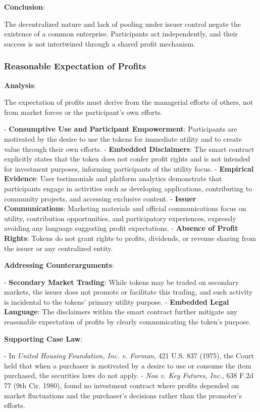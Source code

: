 \documentclass[a4paper,12pt]{article}
\begin{document}
\textbf{Conclusion}:

The decentralized nature and lack of pooling under issuer control negate the existence of a common enterprise. Participants act independently, and their success is not intertwined through a shared profit mechanism.

\subsubsection{Reasonable Expectation of Profits}
\textbf{Analysis}: 

The expectation of profits must derive from the managerial efforts of others, not from market forces or the participant's own efforts.

- \textbf{Consumptive Use and Participant Empowerment}: Participants are motivated by the desire to use the tokens for immediate utility and to create value through their own efforts.
- \textbf{Embedded Disclaimers}: The smart contract explicitly states that the token does not confer profit rights and is not intended for investment purposes, informing participants of the utility focus.
- \textbf{Empirical Evidence}: User testimonials and platform analytics demonstrate that participants engage in activities such as developing applications, contributing to community projects, and accessing exclusive content.
- \textbf{Issuer Communications}: Marketing materials and official communications focus on utility, contribution opportunities, and participatory experiences, expressly avoiding any language suggesting profit expectations.
- \textbf{Absence of Profit Rights}: Tokens do not grant rights to profits, dividends, or revenue sharing from the issuer or any centralized entity.

\textbf{Addressing Counterarguments}:

- \textbf{Secondary Market Trading}: While tokens may be traded on secondary markets, the issuer does not promote or facilitate this trading, and such activity is incidental to the tokens' primary utility purpose.
- \textbf{Embedded Legal Language}: The disclaimers within the smart contract further mitigate any reasonable expectation of profits by clearly communicating the token's purpose.

\textbf{Supporting Case Law}:

- In \emph{United Housing Foundation, Inc. v. Forman}, 421 U.S. 837 (1975), the Court held that when a purchaser is motivated by a desire to use or consume the item purchased, the securities laws do not apply.
- \emph{Noa v. Key Futures, Inc.}, 638 F.2d 77 (9th Cir. 1980), found no investment contract where profits depended on market fluctuations and the purchaser's decisions rather than the promoter's efforts.
\end{document}
